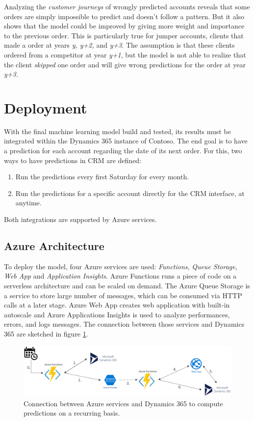 Analyzing the \textit{customer journeys} of wrongly predicted accounts reveals that some orders are simply impossible to predict and doesn't follow a pattern. But it also shows that the model could be improved by giving more weight and importance to the previous order. This is particularly true for jumper accounts, clients that made a order at years \textit{y, y+2,} and \textit{y+3}. The assumption is that these clients ordered from a competitor at year \textit{y+1}, but the model is not able to realize that the client \textit{skipped} one order and will give wrong predictions for the order at year \textit{y+3}.

\section{Deployment} \label{sec:crm-deployment}
With the final machine learning model build and tested, its results must be integrated within the Dynamics 365 instance of Contoso. The end goal is to have a prediction for each account regarding the date of its next order. For this, two ways to have predictions in CRM are defined:
\begin{enumerate}
    \item Run the predictions every first Saturday for every month.
    \item Run the predictions for a specific account directly for the CRM interface, at anytime.
\end{enumerate}

Both integrations are supported by Azure services.

\subsection{Azure Architecture}
To deploy the model, four Azure services are used: \textit{Functions}, \textit{Queue Storage}, \textit{Web App} and \textit{Application Insights}. Azure Functions runs a piece of code on a serverless architecture and can be scaled on demand. The Azure Queue Storage is a service to store large number of messages, which can be consumed via HTTP calls at a later stage. Azure Web App creates web application with built-in autoscale and Azure Applications Insights is used to analyze performances, errors, and logs messages. The connection between those services and Dynamics 365 are sketched in figure \ref{fig:azure-deployment}.

\begin{figure}[htbp]
    \centering
    \includegraphics[width=12cm]{images/azure-archi-weekly.png}
    \caption[Deployment's architecture for scheduled predictions]{Connection between Azure services and Dynamics 365 to compute predictions on a recurring basis.}
    \label{fig:azure-deployment}
\end{figure}

